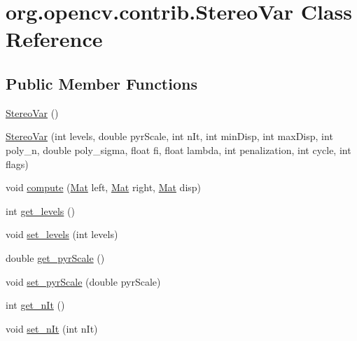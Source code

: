 \hypertarget{classorg_1_1opencv_1_1contrib_1_1_stereo_var}{}\section{org.\+opencv.\+contrib.\+Stereo\+Var Class Reference}
\label{classorg_1_1opencv_1_1contrib_1_1_stereo_var}
\subsection*{Public Member Functions}
\begin{DoxyCompactItemize}
\item 
\mbox{\hyperlink{classorg_1_1opencv_1_1contrib_1_1_stereo_var_a41e4ac2c35cc18a53955d6d3bb847009}{Stereo\+Var}} ()
\item 
\mbox{\hyperlink{classorg_1_1opencv_1_1contrib_1_1_stereo_var_a879bf6a23f69e15102c6a4c2b6cf36cb}{Stereo\+Var}} (int levels, double pyr\+Scale, int n\+It, int min\+Disp, int max\+Disp, int poly\+\_\+n, double poly\+\_\+sigma, float fi, float lambda, int penalization, int cycle, int flags)
\item 
void \mbox{\hyperlink{classorg_1_1opencv_1_1contrib_1_1_stereo_var_a851ce0ae26e06ad2548ee7aabf7d89ec}{compute}} (\mbox{\hyperlink{classorg_1_1opencv_1_1core_1_1_mat}{Mat}} left, \mbox{\hyperlink{classorg_1_1opencv_1_1core_1_1_mat}{Mat}} right, \mbox{\hyperlink{classorg_1_1opencv_1_1core_1_1_mat}{Mat}} disp)
\item 
int \mbox{\hyperlink{classorg_1_1opencv_1_1contrib_1_1_stereo_var_a1505a26ba41668a79f37c1853a6ba26b}{get\+\_\+levels}} ()
\item 
void \mbox{\hyperlink{classorg_1_1opencv_1_1contrib_1_1_stereo_var_ab434591bf0ad62165f4e67ec6726fef4}{set\+\_\+levels}} (int levels)
\item 
double \mbox{\hyperlink{classorg_1_1opencv_1_1contrib_1_1_stereo_var_a3f87b8499219be11b6591c25dfc043d6}{get\+\_\+pyr\+Scale}} ()
\item 
void \mbox{\hyperlink{classorg_1_1opencv_1_1contrib_1_1_stereo_var_ab4fa23f5f0d26050287f8a9bdd2991fd}{set\+\_\+pyr\+Scale}} (double pyr\+Scale)
\item 
int \mbox{\hyperlink{classorg_1_1opencv_1_1contrib_1_1_stereo_var_af39d3bfe3f6e75df7421c1fef2464f4b}{get\+\_\+n\+It}} ()
\item 
void \mbox{\hyperlink{classorg_1_1opencv_1_1contrib_1_1_stereo_var_ad396f6ff2fe956cb7131777eb86c5366}{set\+\_\+n\+It}} (int n\+It)
\item 

\end{DoxyCompactItemize}
